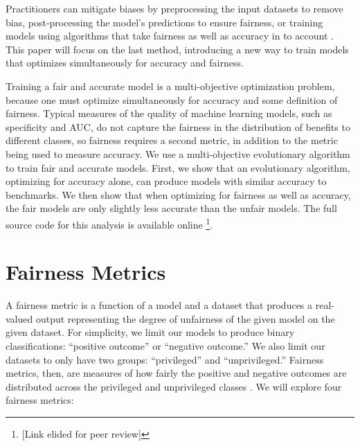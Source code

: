\documentclass[10pt]{acmart}
\begin{document}
Practitioners can mitigate biases by preprocessing the input datasets to remove bias, post-processing the model’s predictions to ensure fairness, or training models using algorithms that take fairness as well as accuracy in to account \citep{Angwin:2016}. This paper will focus on the last method, introducing a new way to train models that optimizes simultaneously for accuracy and fairness.

Training a fair and accurate model is a multi-objective optimization problem, because one must optimize simultaneously for accuracy and some definition of fairness. Typical measures of the quality of machine learning models, such as specificity and AUC, do not capture the fairness in the distribution of benefits to different classes, so fairness requires a second metric, in addition to the metric being used to measure accuracy. We use a multi-objective evolutionary algorithm to train fair and accurate models. First, we show that an evolutionary algorithm, optimizing for accuracy alone, can produce models with similar accuracy to benchmarks. We then show that when optimizing for fairness as well as accuracy, the fair models are only slightly less accurate than the unfair models. The full source code for this analysis is available online \footnote{[Link elided for peer review]}.

\section{Fairness Metrics}
A fairness metric is a function of a model and a dataset that produces a real-valued output representing the degree of unfairness of the given model on the given dataset. For simplicity, we limit our models to produce binary classifications: “positive outcome” or “negative outcome.” We also limit our datasets to only have two groups: “privileged” and “unprivileged.” Fairness metrics, then, are measures of how fairly the positive and negative outcomes are distributed across the privileged and unprivileged classes \citep{Binns:2017}. We will explore four fairness metrics:
\end{document}
